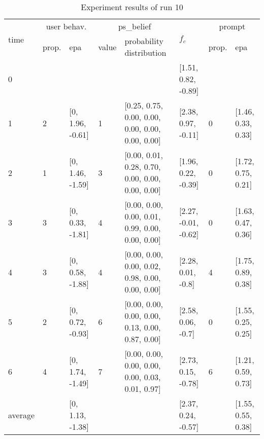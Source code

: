 \begin{table}[htbp]\footnotesize
\caption{Experiment results of run 10}
\begin{tabular}{|p{0.4cm}|p{0.6cm}|l|p{0.6cm}|p{3.3cm}|l|p{0.6cm}|l|}
\hline

\multirow{2}{*}{time} & \multicolumn{2}{c|}{user behav.} & \multicolumn{2}{c|}{ps\_belief} &
\multirow{2}{*}{$f_c$} & \multicolumn{2}{c|}{prompt} \\ \cline{2-5}\cline{ 7- 8}
& prop. & epa & value & probability distribution &  & prop. & epa \\ \hline

0 & \multicolumn{1}{l|}{} &  & \multicolumn{1}{l|}{} &  & [1.51, 0.82, -0.89] & \multicolumn{1}{l|}{} &  \\ \hline
1 & 2 & [0, 1.96, -0.61] & 1 & [0.25, 0.75, 0.00, 0.00, 0.00, 0.00, 0.00, 0.00] & [2.38, 0.97, -0.11] & 0 & [1.46, 0.33, 0.33] \\ \hline
2 & 1 & [0, 1.46, -1.59] & 3 & [0.00, 0.01, 0.28, 0.70, 0.00, 0.00, 0.00, 0.00] & [1.96, 0.22, -0.39] & 0 & [1.72, 0.75, 0.21] \\ \hline
3 & 3 & [0, 0.33, -1.81] & 4 & [0.00, 0.00, 0.00, 0.01, 0.99, 0.00, 0.00, 0.00] & [2.27, -0.01, -0.62] & 0 & [1.63, 0.47, 0.36] \\ \hline
4 & 3 & [0, 0.58, -1.88] & 4 & [0.00, 0.00, 0.00, 0.02, 0.98, 0.00, 0.00, 0.00] & [2.28, 0.01, -0.8] & 4 & [1.75, 0.89, 0.38] \\ \hline
5 & 2 & [0, 0.72, -0.93] & 6 & [0.00, 0.00, 0.00, 0.00, 0.13, 0.00, 0.87, 0.00] & [2.58, 0.06, -0.7] & 0 & [1.55, 0.25, 0.25] \\ \hline
6 & 4 & [0, 1.74, -1.49] & 7 & [0.00, 0.00, 0.00, 0.00, 0.00, 0.03, 0.01, 0.97] & [2.73, 0.15, -0.78] & 6 & [1.21, 0.59, 0.73] \\ \hline
\multicolumn{1}{|l|}{average} & \multicolumn{1}{l|}{} & [0, 1.13, -1.38] & \multicolumn{1}{l|}{} &  & [2.37, 0.24, -0.57] & \multicolumn{1}{l|}{} & [1.55, 0.55, 0.38] \\ \hline
\end{tabular}
\label{}
\end{table}


